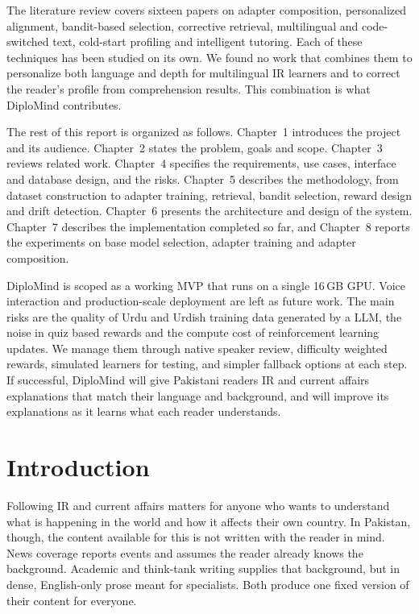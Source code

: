\documentclass{FastFyp}
\begin{document}
The literature review covers sixteen papers on adapter composition, personalized alignment, bandit-based selection, corrective retrieval, multilingual and code-switched text, cold-start profiling and intelligent tutoring. Each of these techniques has been studied on its own. We found no work that combines them to personalize both language and depth for multilingual IR learners and to correct the reader's profile from comprehension results. This combination is what DiploMind contributes.

The rest of this report is organized as follows. Chapter~1 introduces the project and its audience. Chapter~2 states the problem, goals and scope. Chapter~3 reviews related work. Chapter~4 specifies the requirements, use cases, interface and database design, and the risks. Chapter~5 describes the methodology, from dataset construction to adapter training, retrieval, bandit selection, reward design and drift detection. Chapter~6 presents the architecture and design of the system. Chapter~7 describes the implementation completed so far, and Chapter~8 reports the experiments on base model selection, adapter training and adapter composition.

DiploMind is scoped as a working MVP that runs on a single 16\,GB GPU. Voice interaction and production-scale deployment are left as future work. The main risks are the quality of Urdu and Urdish training data generated by a LLM, the noise in quiz based rewards and the compute cost of reinforcement learning updates. We manage them through native speaker review, difficulty weighted rewards, simulated learners for testing, and simpler fallback options at each step. If successful, DiploMind will give Pakistani readers IR and current affairs explanations that match their language and background, and will improve its explanations as it learns what each reader understands.
\pagebreak


\pagestyle{fancy} %
\tableofcontents

\pagebreak
\listoffigures	%
\pagebreak
\listoftables %

\mainmatter


\chapter{Introduction}
Following IR and current affairs matters for anyone who wants to understand what is happening in the world and how it affects their own country. In Pakistan, though, the content available for this is not written with the reader in mind. News coverage reports events and assumes the reader already knows the background. Academic and think-tank writing supplies that background, but in dense, English-only prose meant for specialists. Both produce one fixed version of their content for everyone.
\end{document}
